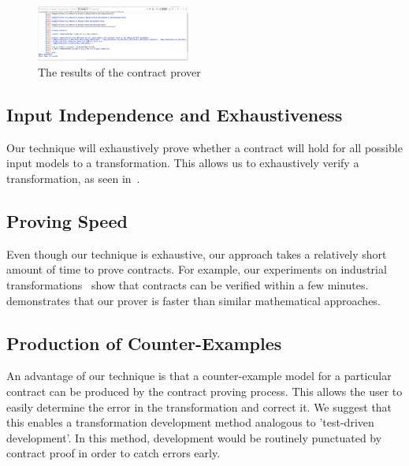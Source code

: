 \begin{figure}
\centering
\includegraphics[width=0.45\textwidth]{figures/output}
\caption{The results of the contract prover}
\label{fig:output}
\end{figure}

\subsection{Input Independence and Exhaustiveness}

Our technique will exhaustively prove whether a contract will hold for all
possible input models to a transformation. This allows us to exhaustively verify
a transformation, as seen in~\cite{Lucio2014}.

\subsection{Proving Speed}

 Even though our technique is exhaustive, our approach takes a relatively short
 amount of time to prove contracts. For example, our experiments on industrial
 transformations~\cite{Oakes} show that contracts can be verified within a few
 minutes. \cite{Selim2014} demonstrates that our prover is faster than similar
 mathematical approaches.

\subsection{Production of Counter-Examples}

An advantage of our technique is that a counter-example model for a particular
contract can be produced by the contract proving process. This allows the user
to easily determine the error in the transformation and correct it. We suggest
that this enables a transformation development method analogous to 'test-driven
development'. In this method, development would be routinely punctuated by
contract proof in order to catch errors early.

 